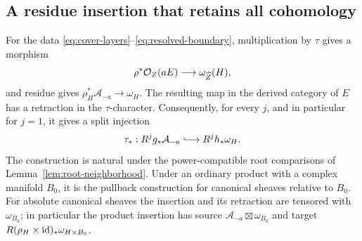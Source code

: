 \subsection{A residue insertion that retains all cohomology}

\begin{proposition}\label{prop:residue-insertion}
For the data \eqref{eq:cover-layers}--\eqref{eq:resolved-boundary},
multiplication by \(\tau\) gives a morphism
\[
 \rho^*\mathcal O_Z(aE)\longrightarrow\omega_{\widehat Z}(H),
\]
and residue gives \(\rho_H^*\mathcal A_{-a}\to\omega_H\).  The resulting
map in the derived category of \(E\) has a retraction in the
\(\tau\)-character.  Consequently, for every \(j\), and in particular
for \(j=1\), it gives a split injection
\begin{equation}\label{eq:residue-injection}
 \tau_*:R^jg_*\mathcal A_{-a}\lhook\joinrel\longrightarrow R^jh_*\omega_H.
\end{equation}
The construction is natural under the power-compatible root comparisons
of Lemma~\ref{lem:root-neighborhood}.  Under an ordinary product with a
complex manifold \(B_0\), it is the pullback construction for canonical
sheaves relative to \(B_0\).  For absolute canonical sheaves the insertion
and its retraction are tensored with \(\omega_{B_0}\); in particular the
product insertion has source \(\mathcal A_{-a}\boxtimes\omega_{B_0}\)
and target \(R(\rho_H\times\mathrm{id})_*\omega_{H\times B_0}\).
\end{proposition}
